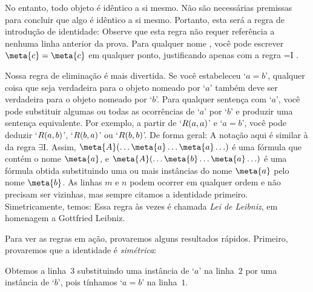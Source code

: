No entanto, todo objeto \'e id\^entico a si mesmo. N\~ao s\~ao necess\'arias premissas para concluir que algo \'e id\^entico a si mesmo. Portanto, esta ser\'a a regra de introdu\c c\~ao de identidade:
Observe que esta regra n\~ao requer refer\^encia a nenhuma linha anterior da prova. Para qualquer nome , voc\^e pode escrever $\meta{c}=\meta{c}$ em qualquer ponto, justificando apenas com a regra  {=}I .
 
Nossa regra de elimina\c c\~ao \'e mais divertida. Se voc\^e estabeleceu `$a=b$',  qualquer coisa que seja verdadeira para o objeto nomeado por `$a$' tamb\'em deve ser verdadeira para o objeto nomeado por `$b$'. Para qualquer senten\c ca com `$a$', voc\^e pode substituir algumas ou todas as ocorr\^encias de `$a$' por `$b$' e produzir uma senten\c ca equivalente. Por exemplo,  a partir de `$\mathord{R}(a,a)$' e `$a = b$',  voc\^e pode deduzir `$\mathord{R}(a,b)$', `$\mathord{R}(b,a)$' ou `$\mathord{R}(b,b)$'. De forma geral:
A nota\c c\~ao aqui \'e similar \`a da regra $\exists$I. Assim, $\meta{A}(\ldots \meta{a} \ldots \meta{a}\ldots)$ \'e uma f\'ormula que cont\'em o nome $\meta{a}$, e $\meta{A}(\ldots \meta{b} \ldots \meta{a}\ldots)$ \'e uma f\'ormula obtida substituindo uma ou mais inst\^ancias do nome $\meta{a}$ pelo nome $\meta{b}$. As linhas $m$ e $n$ podem ocorrer em qualquer ordem e n\~ao precisam ser vizinhas, mas sempre citamos a identidade primeiro. Simetricamente, temos:
Essa regra \`as vezes \'e chamada  \emph{Lei de Leibniz}, em homenagem a Gottfried Leibniz. 

Para ver as regras em a\c c\~ao, provaremos alguns resultados r\'apidos. Primeiro, provaremos que a identidade \'e  \emph{sim\'etrica}:
 
\begin{fitchproof}
	\open
	\close
\end{fitchproof}
Obtemos a linha~$3$ substituindo uma inst\^ancia de `$a$'  na linha~$2$ por uma inst\^ancia de `$b$', pois t\'inhamos `$a= b$' na linha~$1$.

